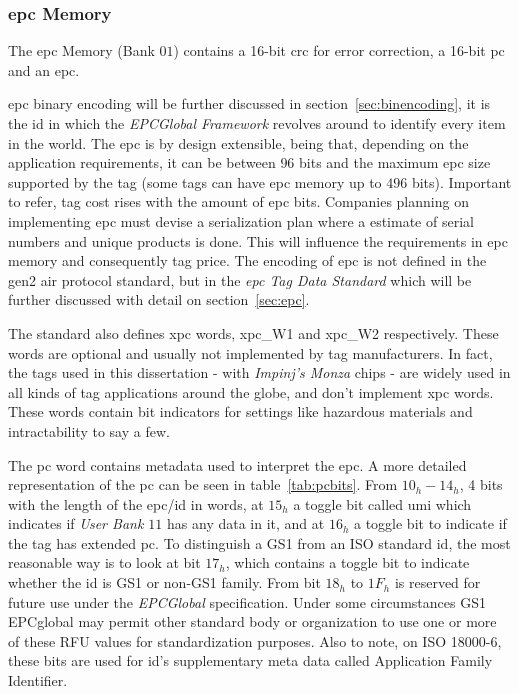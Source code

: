 \subsubsection{\ac{epc} Memory}

The \ac{epc} Memory (Bank $01$) contains a 16-bit \ac{crc} for error correction, a 16-bit \ac{pc} and an \ac{epc}.

\ac{epc} binary encoding will be further discussed in section~\ref{sec:binencoding}, it is the \ac{id} in which the \emph{EPCGlobal Framework} revolves around to identify every item in the world. The \ac{epc} is by design extensible, being that, depending on the application requirements, it can be between $96$ bits and the maximum \ac{epc} size supported by the tag (some tags can have \ac{epc} memory up to $496$ bits). Important to refer, tag cost rises with the amount of \ac{epc} bits. Companies planning on implementing \ac{epc} must devise a serialization plan where a estimate of serial numbers and unique products is done. This will influence the requirements in \ac{epc} memory and consequently tag price.
The encoding of \ac{epc} is not defined in the \ac{gen2} air protocol standard, but in the \emph{\ac{epc} Tag Data Standard} which will be further discussed with detail on section~\ref{sec:epc}.

The standard also defines \ac{xpc} words, \acs{xpc}\_W1 and \acs{xpc}\_W2 respectively. These words are optional and usually not implemented by tag manufacturers. In fact, the tags used in this dissertation - with \textit{Impinj's Monza} chips - are widely used in all kinds of tag applications around the globe, and don't implement \ac{xpc} words. These words contain bit indicators for settings like hazardous materials and intractability to say a few.

The \ac{pc} word contains metadata used to interpret the \ac{epc}. A more detailed representation of the \ac{pc} can be seen in table~\ref{tab:pcbits}.
From $10_h-14_h$, 4 bits with the length of the \ac{epc}/\ac{id} in words, at $15_h$ a toggle bit called \ac{umi} which indicates if \emph{User Bank $11$} has any data in it, and at $16_h$ a toggle bit to indicate if the tag has extended \ac{pc}.
To distinguish a GS1 from an ISO standard \ac{id}, the most reasonable way is to look at bit $17_h$, which contains a toggle bit to indicate whether the \ac{id} is GS1 or non-GS1 family.
From bit $18_h$ to $1F_h$ is reserved for future use under the \emph{EPCGlobal} specification. Under some circumstances GS1 EPCglobal may permit other standard body or organization to use one or more of these RFU values for standardization purposes. Also to note, on ISO 18000-6, these bits are used for \ac{id}'s supplementary meta data called Application Family Identifier.


